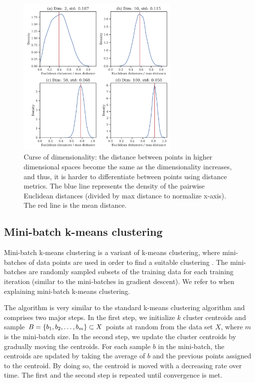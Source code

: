 \begin{figure}[H]
    \centering
    \includegraphics[width=0.7\textwidth]{thesis/figures/curse-of-dimensionality.pdf}
    \caption{Curse of dimensionality: the distance between points in higher dimensional spaces become the same as the dimensionality increases, and thus, it is harder to differentiate between points using distance metrics. The blue line represents the density of the pairwise Euclidean distances (divided by max distance to normalize x-axis). The red line is the mean distance.}
    \label{fig:curse-of-dimensionality}
\end{figure}

\subsection{Mini-batch k-means clustering}
\label{sec:mini-batch-k-means-clustering}
Mini-batch k-means clustering is a variant of k-means clustering, where mini-batches of data points are used in order to find a suitable clustering \cite{sculley2010}. The mini-batches are randomly sampled subsets of the training data for each training iteration (similar to the mini-batches in gradient descent). We refer to \cite{sculley2010} when explaining mini-batch k-means clustering.

The algorithm is very similar to the standard k-means clustering algorithm and comprises two major steps. In the first step, we initialize $k$ cluster centroids and sample $B=\left\{b_1, b_2, \ldots, b_m\right\} \subset X$ points at random from the data set $X$, where $m$ is the mini-batch size. In the second step, we update the cluster centroids by gradually moving the centroids. For each sample $b$ in the mini-batch, the centroids are updated by taking the average of $b$ and the previous points assigned to the centroid. By doing so, the centroid is moved with a decreasing rate over time. The first and the second step is repeated until convergence is met.

